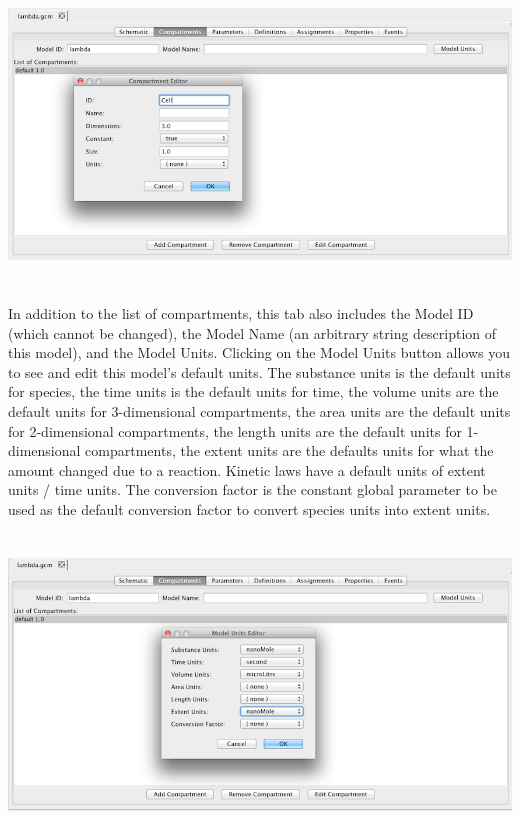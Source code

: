 \documentclass[titlepage,11pt]{article}
\begin{document}
\begin{center}
\includegraphics[height=80mm]{screenshots/compartment}
\end{center}

\noindent
In addition to the list of compartments, this tab also includes the Model ID (which cannot be changed), the Model Name (an arbitrary string description of this model), and the Model Units.  Clicking on the Model Units button allows you to see and edit this model's default units.  The substance units is the default units for species, the time units is the default units for time, the volume units are the default units for 3-dimensional compartments, the area units are the default units for 2-dimensional compartments, the length units are the default units for 1-dimensional compartments, the extent units are the defaults units for what the amount changed due to a reaction.  Kinetic laws have a default units of extent units / time units.  The conversion factor is the constant global parameter to be used as the default conversion factor to convert species units into extent units.

\begin{center}
\includegraphics[height=80mm]{screenshots/ModelUnits}
\end{center}
\end{document}
